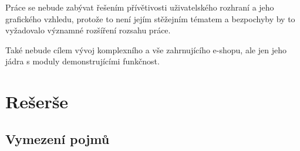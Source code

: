 \documentclass[11pt,twoside,a4paper]{book}
\begin{document}
Práce se nebude zabývat řešením přívětivosti uživatelského rozhraní a jeho grafického vzhledu, protože to není jejím stěžejním tématem a bezpochyby by to vyžadovalo významné rozšíření rozsahu práce.

Také nebude cílem vývoj komplexního a vše zahrnujícího e-shopu, ale jen jeho jádra s moduly demonstrujícími funkčnost.





\chapter{Rešerše}
\label{sec:reserse}

\section{Vymezení pojmů}
\end{document}
